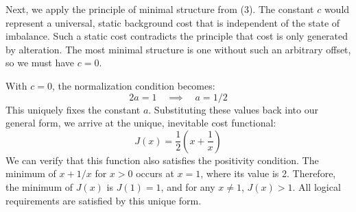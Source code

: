 \documentclass[11pt,a4paper]{article}
\begin{document}
Next, we apply the principle of minimal structure from (3). The constant \(c\) would represent a universal, static background cost that is independent of the state of imbalance. Such a static cost contradicts the principle that cost is only generated by alteration. The most minimal structure is one without such an arbitrary offset, so we must have \(c=0\).

With \(c=0\), the normalization condition becomes:
\begin{equation}
2a = 1 \quad \implies \quad a = 1/2
\end{equation}
This uniquely fixes the constant \(a\). Substituting these values back into our general form, we arrive at the unique, inevitable cost functional:
\begin{equation}
J(x) = \frac{1}{2}\left(x + \frac{1}{x}\right)
\end{equation}
We can verify that this function also satisfies the positivity condition. The minimum of \(x+1/x\) for \(x>0\) occurs at \(x=1\), where its value is 2. Therefore, the minimum of \(J(x)\) is \(J(1)=1\), and for any \(x \neq 1\), \(J(x) > 1\). All logical requirements are satisfied by this unique form.
\end{document}
